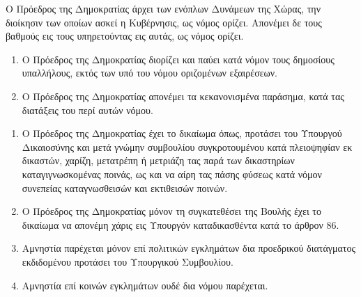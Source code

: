 \documentclass[twoside, a4paper, 10pt]{article}
\begin{document}
\begin{multicols}{2}
\begin{enumerate}
\begin{BigQuote}
Ο Πρόεδρος της Δημοκρατίας άρχει των ενόπλων Δυνάμεων της Χώρας, την διοίκησιν των οποίων ασκεί η Κυβέρνησις, ως νόμος ορίζει. Απονέμει δε τους βαθμούς εις τους υπηρετούντας εις αυτάς, ως νόμος ορίζει.

\begin{enumerate}
  \item[1.] Ο Πρόεδρος της Δημοκρατίας διορίζει και παύει κατά νόμον τους δημοσίους υπαλλήλους, εκτός των υπό του νόμου οριζομένων εξαιρέσεων.
  \item[2.] Ο Πρόεδρος της Δημοκρατίας απονέμει τα κεκανονισμένα παράσημα, κατά τας διατάξεις του περί αυτών νόμου.
\end{enumerate}

\begin{enumerate}
  \item[1.] Ο Πρόεδρος της Δημοκρατίας έχει το δικαίωμα όπως, προτάσει του Υπουργού Δικαιοσύνης και μετά γνώμην συμβουλίου συγκροτουμένου κατά πλειοψηφίαν εκ δικαστών, χαρίζη, μετατρέπη ή μετριάζη τας παρά των δικαστηρίων καταγιγνωσκομένας ποινάς, ως και να αίρη τας πάσης φύσεως κατά νόμον συνεπείας καταγνωσθεισών και εκτιθεισών ποινών.
  \item[2.] Ο Πρόεδρος της Δημοκρατίας μόνον τη  συγκατεθέσει της Βουλής έχει το δικαίωμα να απονέμη χάρις εις Υπουργόν καταδικασθέντα κατά το άρθρον 86.
  \item[3.] Αμνηστία παρέχεται μόνον επί πολιτικών εγκλημάτων δια προεδρικού διατάγματος εκδιδομένου προτάσει του Υπουργικού Συμβουλίου.
  \item[4.] Αμνηστία επί κοινών εγκλημάτων ουδέ δια νόμου παρέχεται.
\end{enumerate}


\end{BigQuote}
\end{enumerate}
\end{multicols}
\end{document}
